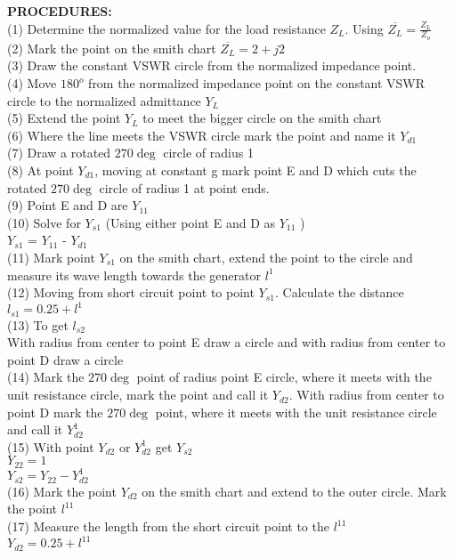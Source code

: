 \textbf{PROCEDURES:}\\
(1) Determine the normalized value for the load resistance $Z_{L}$. Using $\overline{Z_{L}} = \frac{Z_{L}}{Z_{o}}$  \\
(2) Mark the point on the smith chart $\overline{Z_{L}} = 2 + j2$  \\  
(3) Draw the constant VSWR circle from the normalized impedance point.\\
(4) Move $180^{o}$ from the normalized impedance point on the constant VSWR circle to the normalized admittance $Y_{L}$ \\
(5) Extend the point $Y_{L}$ to meet the bigger circle on the smith chart  \\
(6) Where the line meets the VSWR circle mark the point and name it $Y_{d1}$   \\                     (7) Draw a rotated $270\deg $ circle of radius 1       \\                                            
(8) At point $Y_{d1}$, moving at constant g mark point E and D which cuts the rotated $270\deg $ circle of radius 1 at point ends.\\
(9) Point E and D are $Y_{11}$\\                                                     
(10) Solve for $Y_{s1}$ (Using either point E and D as $Y_{11}$  )     \\     
 $Y_{s1}$ =    $Y_{11}$ -    $Y_{d1}$   \\                  (11) Mark point $Y_{s1}$ on the smith chart, extend the point to the circle and measure its wave length  towards the generator $l^{1}$ \\
 (12) Moving from short circuit point to point $Y_{s1}$. Calculate the distance\\
$ l_{s1} = 0.25 + l^{1} $                                                                        
\\
(13) To get $l_{s2}$ \\
With radius from center to point E
draw a circle and with radius from center to point D draw a circle\\
(14) Mark the $270\deg$ point of radius point E circle, where it meets with the unit resistance circle, mark the point and call it $Y_{d2}$. With radius from center to point D mark the $270\deg$ point, where it meets with the unit resistance circle and call it $Y_{d2}^{1}$ \\
(15) With point $Y_{d2}$ or $Y_{d2}^{1}$ get $Y_{s2}$\\
$Y_{22}=1$\\
$Y_{s2}=Y_{22}-Y_{d2}^{1}$\\
(16) Mark the point $Y_{d2}$ on the smith chart and extend to the outer circle. Mark the point $l^{11}$\\
(17) Measure the length from the short circuit point to the $l^{11}$\\
$Y_{d2} = 0.25 + l^{11}$


